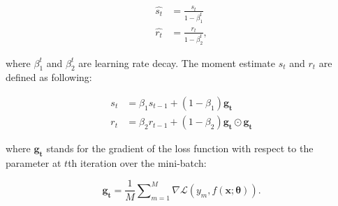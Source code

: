 \documentclass[
	parskip, 			   %
	twoside, 			   %
	DIV=14, 			   %
	BCOR=15.0mm, 		   %
	headsepline, 		   %
	open=right, 		   %
	captions=tableheading, %
	bibliography=totoc,    %
	numbers=noenddot       %
]{scrreprt}
\begin{document}
\begin{equation}
    \label{eq:correct_moment_estimate}
    \begin{aligned}
        \hat{s_t} &= \frac{s_t}{1-\beta_1^t}
        \\
        \hat{r_t} &= \frac{r_t}{1-\beta_2^t},
    \end{aligned}
\end{equation}

where $\beta_1^t$ and $\beta_2^t$ are learning rate decay. The moment estimate $s_t$ and $r_t$ are defined as following:

\begin{equation}
    \label{eq:moment_estimate}
    \begin{aligned}
        s_t &= \beta_1 s_{t-1} + (1-\beta_1) \mathbf{g_t}
        \\
        r_t &= \beta_2 r_{t-1} + (1-\beta_2) \mathbf{g_t} \odot \mathbf{g_t}
    \end{aligned}
\end{equation}

where $\mathbf{g_t}$ stands for the gradient of the loss function with respect to the parameter at $t$th iteration over the mini-batch:

\begin{equation}
    \label{eq:mean_gradient}
    \mathbf{g_t} = \frac{1}{M} \sum\nolimits_{m=1}^M \nabla \mathcal{L}\left( y_{m},f(\mathbf{x};\mathbf{\theta}) \right).
\end{equation}
 
\end{document}
